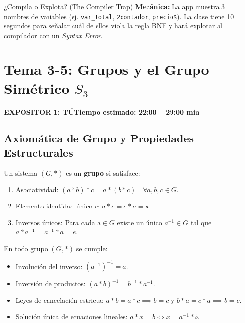 \documentclass[11pt,a4paper]{article}
\newcommand{\badgeTu}{\colorbox{exp1bg}{\textcolor{exp1fg}{\bfseries\sffamily\footnotesize EXPOSITOR 1: TÚ}}}
\begin{document}
\begin{minijuego}{¿Compila o Explota? (The Compiler Trap)}
\textbf{Mecánica:} La app muestra 3 nombres de variables (ej. \texttt{var\_total}, \texttt{2contador}, \texttt{precio\$}). La clase tiene 10 segundos para señalar cuál de ellos viola la regla BNF y hará explotar al compilador con un \textit{Syntax Error}.
\end{minijuego}

\newpage

\section{Tema 3-5: Grupos y el Grupo Simétrico $S_3$}
\noindent\badgeTu \hfill \textbf{Tiempo estimado: 22:00 -- 29:00 min}

\subsection{Axiomática de Grupo y Propiedades Estructurales}
\begin{definicion}[Grupo]
Un sistema $(G, *)$ es un \textbf{grupo} si satisface:
\begin{enumerate}[noitemsep]
  \item Asociatividad: $(a * b) * c = a * (b * c) \quad \forall a, b, c \in G$.
  \item Elemento identidad único $e$: $a * e = e * a = a$.
  \item Inversos únicos: Para cada $a \in G$ existe un único $a^{-1} \in G$ tal que $a * a^{-1} = a^{-1} * a = e$.
\end{enumerate}
\end{definicion}

\begin{teorema}
En todo grupo $(G, *)$ se cumple:
\begin{itemize}[noitemsep]
  \item Involución del inverso: $(a^{-1})^{-1} = a$.
  \item Inversión de productos: $(a * b)^{-1} = b^{-1} * a^{-1}$.
  \item Leyes de cancelación estricta: $a * b = a * c \implies b = c$ y $b * a = c * a \implies b = c$.
  \item Solución única de ecuaciones lineales: $a * x = b \iff x = a^{-1} * b$.
\end{itemize}
\end{teorema}
\end{document}
